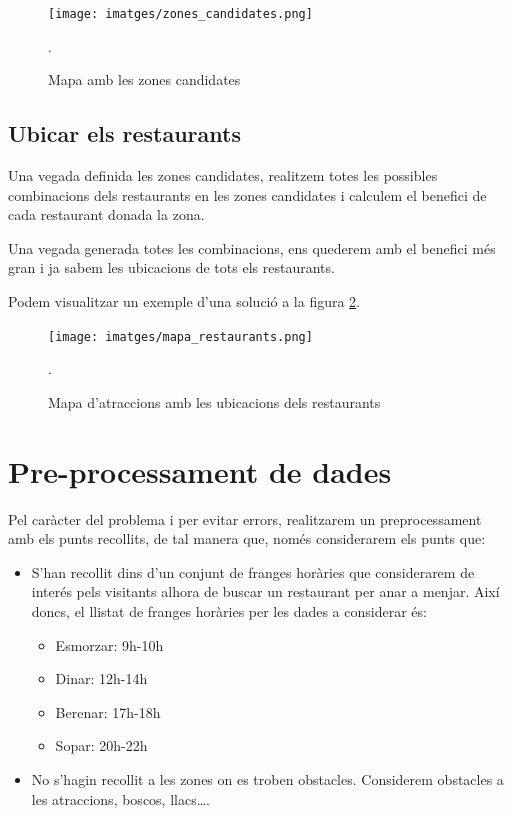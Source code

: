 \documentclass[12pt]{article}
\begin{document}
\begin{figure}[h]
	\centering
	\texttt{[image: imatges/zones\_candidates.png]}\par\vspace{1cm}
	\caption{Mapa amb les zones candidates}.
	\label{fig:zones_candidates}
\end{figure}

\subsection{Ubicar els restaurants}

Una vegada definida les zones candidates, realitzem totes les possibles combinacions dels restaurants en les zones candidates i calculem el benefici de cada restaurant donada la zona. 

Una vegada generada totes les combinacions, ens quederem amb el benefici més gran i ja sabem les ubicacions de tots els restaurants.

Podem visualitzar un exemple d'una solució a la figura \ref{fig:mapa_restaurants}.

\begin{figure}[h]
	\centering
	\texttt{[image: imatges/mapa\_restaurants.png]}\par\vspace{1cm}
	\caption{Mapa d'atraccions amb les ubicacions dels restaurants}.
	\label{fig:mapa_restaurants}
\end{figure}


\section{Pre-processament de dades}
Pel caràcter del problema i per evitar errors, realitzarem un preprocessament amb els punts recollits, de tal manera que, només considerarem els punts que:
\begin{itemize}
	\item S’han recollit dins d’un conjunt de franges horàries que considerarem de interés pels visitants alhora de buscar un restaurant per anar a menjar. 
	Així doncs, el llistat de franges horàries per les dades a considerar és:
	\begin{itemize}
		\item Esmorzar: 9h-10h
		\item Dinar: 12h-14h
		\item Berenar: 17h-18h
		\item Sopar: 20h-22h
	\end{itemize}

	\item No s’hagin recollit a les zones on es troben obstacles. 
	Considerem obstacles a les atraccions, boscos, llacs….
\end{itemize}
\end{document}
